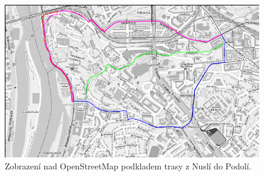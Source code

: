 \documentclass[thesis=B,czech]{FITthesis}[2012/06/26]
\begin{document}
\begin{figure}[!ht]
\centering
\includegraphics[width=\columnwidth]{porovnani/ll-nus.pdf}
\caption{Zobrazení nad OpenStreetMap podkladem trasy z Nuslí do Podolí. }
\label{img:mapa-n}
\end{figure}
\end{document}
